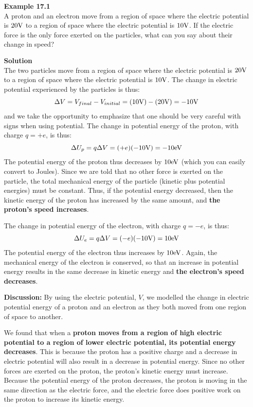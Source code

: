 \begin{framed}
\textbf{Example 17.1}\\
A proton and an electron move from a region of space where the electric potential is $20 {\rm V}$ to a region of space where the electric potential is $10 {\rm V}$. If the electric force is the only force exerted on the particles, what can you say about their change in speed?

\begin{framed}
\textbf{Solution}\\
The two particles move from a region of space where the electric potential is $20 {\rm V}$ to a region of space where the electric potential is $10 {\rm V}$. The change in electric potential experienced by the particles is thus:
\begin{equation}
\Delta V = V_{final}-V_{initial}=(10 {\rm V})-(20 {\rm V})=-10 {\rm V}
\end{equation}
and we take the opportunity to emphasize that one should be very careful with signs when using potential. The change in potential energy of the proton, with charge $q=+e$, is thus:
\begin{equation}
\Delta U_p=q\Delta V = (+e)(-10 {\rm V})=-10 {\rm eV}
\end{equation}
The potential energy of the proton thus decreases by $10 {\rm eV}$ (which you can easily convert to Joules). Since we are told that no other force is exerted on the particle, the total mechanical energy of the particle (kinetic plus potential energies) must be constant. Thus, if the potential energy decreased, then the kinetic energy of the proton has increased by the same amount, and \textbf{the proton's speed increases}.

The change in potential energy of the electron, with charge $q= -e$, is thus:
\begin{equation}
\Delta U_e=q\Delta V = (-e)(-10 {\rm V}) = 10 {\rm eV}
\end{equation}
The potential energy of the electron thus increases by $10 {\rm eV}$. Again, the mechanical energy of the electron is conserved, so that an increase in potential energy results in the same decrease in kinetic energy and \textbf{the electron's speed decreases}.

\textbf{Discussion:} By using the electric potential, $V$, we modelled the change in electric potential energy of a proton and an electron as they both moved from one region of space to another.

We found that when a \textbf{proton moves from a region of high electric potential to a region of lower electric potential, its potential energy decreases}. This is because the proton has a positive charge and a decrease in electric potential will also result in a decrease in potential energy. Since no other forces are exerted on the proton, the proton's kinetic energy must increase. Because the potential energy of the proton decreases, the proton is moving in the same direction as the electric force, and the electric force does positive work on the proton to increase its kinetic energy.


\end{framed}
\end{framed}
